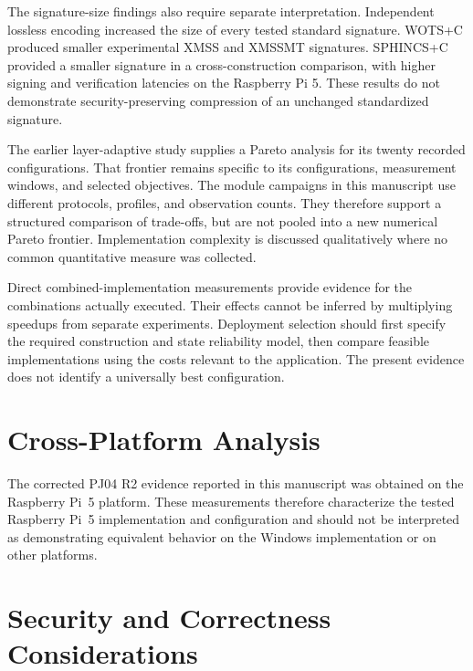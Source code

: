 \documentclass[pdflatex,sn-mathphys-num]{sn-jnl}
\begin{document}
The signature-size findings also require separate interpretation.
Independent lossless encoding increased the size of every tested
standard signature. WOTS+C produced smaller experimental XMSS and
XMSSMT signatures. SPHINCS+C provided a smaller signature in a
cross-construction comparison, with higher signing and verification
latencies on the Raspberry Pi 5. These results do not demonstrate
security-preserving compression of an unchanged standardized signature.

The earlier layer-adaptive study supplies a Pareto analysis for its
twenty recorded configurations. That frontier remains specific to
its configurations, measurement windows, and selected objectives.
The module campaigns in this manuscript use different protocols,
profiles, and observation counts. They therefore support a structured
comparison of trade-offs, but are not pooled into a new numerical
Pareto frontier. Implementation complexity is discussed qualitatively
where no common quantitative measure was collected.

Direct combined-implementation measurements provide evidence for
the combinations actually executed. Their effects cannot be inferred
by multiplying speedups from separate experiments. Deployment
selection should first specify the required construction and state
reliability model, then compare feasible implementations using the
costs relevant to the application. The present evidence does not
identify a universally best configuration.

\section{Cross-Platform Analysis}





The corrected PJ04 R2 evidence reported in this manuscript was obtained on the
Raspberry Pi~5 platform. These measurements therefore characterize the tested
Raspberry Pi~5 implementation and configuration and should not be interpreted
as demonstrating equivalent behavior on the Windows implementation or on
other platforms.

\label{sec:crossplatform}


\section{Security and Correctness Considerations}
\label{sec:security}
\end{document}
